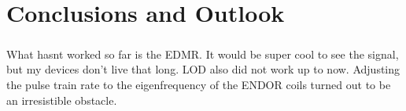 \chapter{Conclusions and Outlook}

\paragraph*{}
What hasnt worked so far is the EDMR. It would be super cool to see the signal, but my devices don't live that long. LOD also did not work up to now. Adjusting the pulse train rate to the eigenfrequency of the ENDOR coils turned out to be an irresistible obstacle.
\paragraph*{}
\\




